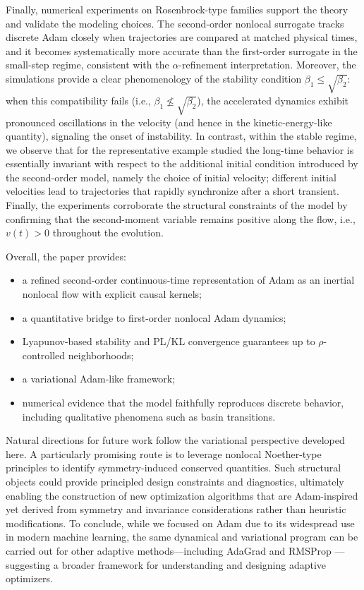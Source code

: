 \documentclass{article} %
\begin{document}
Finally, numerical experiments on Rosenbrock-type families support the theory and validate the modeling choices. The second-order nonlocal surrogate tracks discrete Adam closely when trajectories are compared at matched physical times, and it becomes systematically more accurate than the first-order surrogate in the small-step regime, consistent with the $\alpha$-refinement interpretation. 
Moreover, the simulations provide a clear phenomenology of the stability condition $\beta_1 \le \sqrt{\beta_2}$: when this compatibility fails (i.e., $\beta_1 \nleq \sqrt{\beta_2}$), the accelerated dynamics exhibit pronounced oscillations in the velocity (and hence in the kinetic-energy-like quantity), signaling the onset of instability. In contrast, within the stable regime, we observe that for the representative example studied the long-time behavior is essentially invariant with respect to the additional initial condition introduced by the second-order model, namely the choice of initial velocity; different initial velocities lead to trajectories that rapidly synchronize after a short transient.  Finally, the experiments corroborate the structural constraints of the model by confirming that the second-moment variable remains positive along the flow, i.e., $v(t)>0$ throughout the evolution.

Overall, the paper provides:
\begin{itemize}
  \item a refined second-order continuous-time representation of Adam as an inertial nonlocal flow with explicit causal kernels;
  \item a quantitative bridge to first-order nonlocal Adam dynamics;
  \item Lyapunov-based stability and PL/KL convergence guarantees up to $\rho$-controlled neighborhoods;
  \item a variational Adam-like framework;
  \item numerical evidence that the model faithfully reproduces discrete behavior, including qualitative phenomena such as basin transitions.
\end{itemize}

Natural directions for future work follow the variational perspective developed here. 
A particularly promising route is to leverage nonlocal Noether-type principles to identify symmetry-induced conserved quantities. Such structural objects could provide principled design constraints and diagnostics, ultimately enabling the construction of new optimization algorithms that are Adam-inspired yet derived from symmetry and invariance considerations rather than heuristic modifications. To conclude, while we focused on Adam due to its widespread use in modern machine learning, the same dynamical and variational program can be carried out for other adaptive methods---including AdaGrad \cite{AdaGra} and RMSProp \cite{hinton_lecture6}---suggesting a broader framework for understanding and designing adaptive optimizers.
\end{document}
